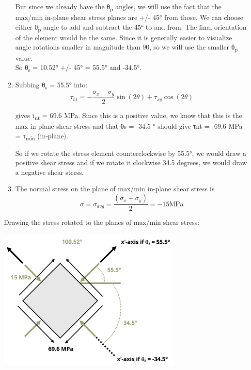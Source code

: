 \documentclass[
  letterpaper,
  DIV=11,
  numbers=noendperiod]{scrreprt}
\theoremstyle{definition}
\theoremstyle{remark}
\begin{document}
\begin{tcolorbox}
\begin{tcolorbox}
\begin{enumerate}
  But since we already have the θ\textsubscript{p} angles, we will use
  the fact that the max/min in-plane shear stress planes are +/- 45°
  from those. We can choose either θ\textsubscript{p} angle to add and
  subtract the 45° to and from. The final orientation of the element
  would be the same. Since it is generally easier to visualize angle
  rotations smaller in magnitude than 90, so we will use the smaller
  θ\textsubscript{p} value.\\
  So θ\textsubscript{s} = 10.52° +/- 45° = 55.5° and -34.5°.
\item
  Subbing θ\textsubscript{s} = 55.5° into:\\
  \[
  \tau_{n t}=-\frac{\sigma_x-\sigma_y}{2} \sin (2 \theta)+\tau_{x y} \cos (2 \theta)
  \]

  gives τ\textsubscript{nt} = 69.6 MPa. Since this is a positive value,
  we know that this is the max in-plane shear stress and that θs = -34.5
  ° should give τnt = -69.6 MPa = τ\textsubscript{min} (in-plane).

  So if we rotate the stress element counterclockwise by 55.5°, we would
  draw a positive shear stress and if we rotate it clockwise 34.5
  degrees, we would draw a negative shear stress.
\item
  The normal stress on the plane of max/min in-plane shear stress is\\
  \[
  \sigma=\sigma_{avg}=\frac{\left(\sigma_x+\sigma_y\right)}{2}=-15 \mathrm{MPa}
  \]
\end{enumerate}

Drawing the stress rotated to the planes of max/min shear stress:

\begin{center}
\includegraphics[width=3.64583in,height=\textheight]{images/CH12 figures/example 12.3 part 3.png}
\end{center}


\end{tcolorbox}
\end{tcolorbox}
\end{document}
